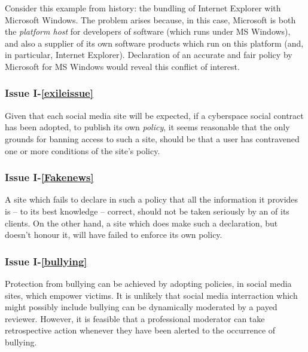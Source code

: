 %
Consider this example from history: the bundling of Internet Explorer 
with Microsoft Windows.  
The problem arises because, in this case, Microsoft is both the 
{\em platform host} for developers of software (which runs under MS Windows),
and also a supplier of its own software
products which run on this platform (and, in particular, Internet Explorer).
Declaration of an accurate and fair policy by Microsoft for MS Windows would reveal
this conflict of interest.

\subsubsection*{Issue I-\ref{exileissue}}\label{exilesol}

Given that each social media site will be expected, if a cyberspace
social contract has been adopted, to publish its own {\em policy}, it
seems reasonable that the only grounds for banning access to such a
site, should be that a user has contravened one or more conditions of the site's
policy. 

\subsubsection*{Issue I-\ref{Fakenews}}\label{disinfsol}


A site which fails to declare in such a policy that all the information it provides
is -- to its best knowledge -- correct, should not be taken seriously
by an of its clients. On the other hand, a site which does make such
a declaration, but doesn't honour it, will have failed to enforce its own policy.

\subsubsection*{Issue I-\ref{bullying}}\label{bullyingsol}

Protection from bullying can be achieved by adopting policies,
in social media sites, which empower victims. It is unlikely
that social media interraction which might possibly include bullying
can be dynamically moderated by a payed reviewer. However, it is feasible
that a professional moderator can take retrospective action whenever
they have been alerted to the occurrence of bullying.


